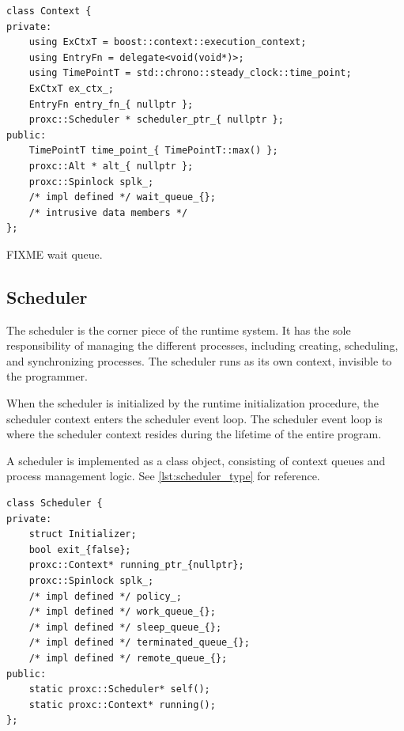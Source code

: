 \begin{lstfloat}
\begin{lstlisting}[caption={Minimal context type.}, label={lst:context_type}, style={CustomC++}, xleftmargin={2em}]
class Context {
private:
    using ExCtxT = boost::context::execution_context;
    using EntryFn = delegate<void(void*)>;
    using TimePointT = std::chrono::steady_clock::time_point;
    ExCtxT ex_ctx_;
    EntryFn entry_fn_{ nullptr };
    proxc::Scheduler * scheduler_ptr_{ nullptr };
public:
    TimePointT time_point_{ TimePointT::max() };
    proxc::Alt * alt_{ nullptr };
    proxc::Spinlock splk_;
    /* impl defined */ wait_queue_{};
    /* intrusive data members */
};
\end{lstlisting}
\end{lstfloat}

FIXME wait queue.


\subsection{Scheduler}
\label{subsec:scheduler_implementation}


The scheduler is the corner piece of the runtime system. It has the sole responsibility of managing the different processes, including creating, scheduling, and synchronizing processes. The scheduler runs as its own context, invisible to the programmer.

When the scheduler is initialized by the runtime initialization procedure, the scheduler context enters the scheduler event loop. The scheduler event loop is where the scheduler context resides during the lifetime of the entire program.

A scheduler is implemented as a class object, consisting of context queues and process management logic. See \cref{lst:scheduler_type} for reference.

\begin{lstfloat}
\begin{lstlisting}[caption={Minimal scheduler type.}, label={lst:scheduler_type}, style={CustomC++}, xleftmargin={2em}]
class Scheduler {
private:
    struct Initializer;
    bool exit_{false};
    proxc::Context* running_ptr_{nullptr};
    proxc::Spinlock splk_;
    /* impl defined */ policy_;
    /* impl defined */ work_queue_{};
    /* impl defined */ sleep_queue_{};
    /* impl defined */ terminated_queue_{};
    /* impl defined */ remote_queue_{};
public:
    static proxc::Scheduler* self();
    static proxc::Context* running();
};
\end{lstlisting}
\end{lstfloat}


